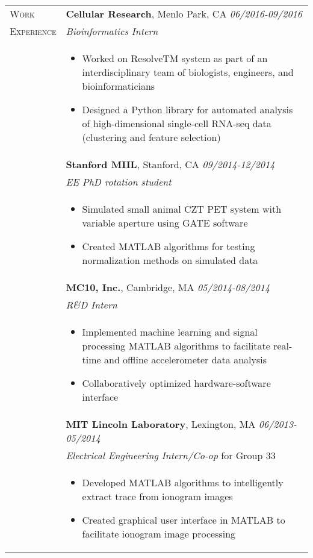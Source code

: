 \documentclass[letterpaper,11pt,oneside]{article}
\begin{document}
\begin{longtable}{@{} p{2.5cm} p{14.8cm}}
     
  \large{\textsc{Work}}  & \textbf{Cellular Research}, Menlo Park, CA \hfill \textit{06/2016-09/2016} \\*
  \large{\textsc{Experience}}  & \textit{Bioinformatics Intern} \\* 
& 
\vspace{-7mm}
\begin{itemize}[leftmargin=.5cm]
	\setlength\itemsep{-0.3em}
	\item Worked on ResolveTM system as part of an interdisciplinary team of biologists, engineers, and bioinformaticians
	\item Designed a Python library for automated analysis of high-dimensional single-cell RNA-seq data (clustering and feature selection)
\end{itemize} 
\\

& \textbf{Stanford MIIL}, Stanford, CA \hfill \textit{09/2014-12/2014} \\
& \textit{EE PhD rotation student} \\ 
& 
\vspace{-7mm}
\begin{itemize}[leftmargin=.5cm]
	\setlength\itemsep{-0.3em}
	\item Simulated small animal CZT PET system with variable aperture using GATE software
	\item Created MATLAB algorithms for testing normalization methods on simulated data
\end{itemize} 
\\

& \textbf{MC10, Inc.}, Cambridge, MA \hfill \textit{05/2014-08/2014} \\
& \textit{R\&D Intern} \\ 
& 
\vspace{-7mm}
\begin{itemize}[leftmargin=.5cm]
	\setlength\itemsep{-0.3em}
	\item Implemented machine learning and signal processing MATLAB algorithms to facilitate real-time and offline accelerometer data analysis
	\item Collaboratively optimized hardware-software interface
\end{itemize} 
\\

& \textbf{MIT Lincoln Laboratory}, Lexington, MA \hfill \textit{06/2013-05/2014} \\
& \textit{Electrical Engineering Intern/Co-op} for Group 33 \\ 
& 
\vspace{-7mm}
\begin{itemize}[leftmargin=.5cm]
	\setlength\itemsep{-0.3em}
	\item Developed MATLAB algorithms to intelligently extract trace from ionogram images
	\item Created graphical user interface in MATLAB to facilitate ionogram image processing
\end{itemize} 
\\


\end{longtable}
\end{document}
